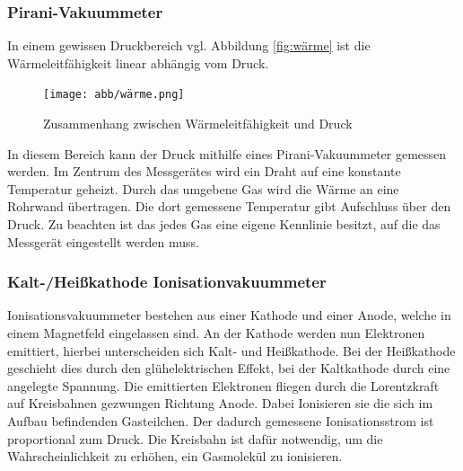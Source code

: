 \subsubsection*{Pirani-Vakuummeter}
In einem gewissen Druckbereich vgl. Abbildung \eqref{fig:wärme} ist die Wärmeleitfähigkeit linear abhängig vom Druck.
\begin{figure}[h]
    \centering
    \texttt{[image: abb/wärme.png]}
    \caption{Zusammenhang zwischen Wärmeleitfähigkeit und Druck \cite{Pfeifer}}
    \label{fig:wärme}
\end{figure}
In diesem Bereich kann der Druck mithilfe eines Pirani-Vakuummeter gemessen werden.
Im Zentrum des Messgerätes wird ein Draht auf eine konstante Temperatur geheizt.
Durch das umgebene Gas wird die Wärme an eine Rohrwand übertragen.
Die dort gemessene Temperatur gibt Aufschluss über den Druck.
Zu beachten ist das jedes Gas eine eigene Kennlinie besitzt,
auf die das Messgerät eingestellt werden muss.

\subsubsection*{Kalt-/Heißkathode Ionisationvakuummeter}
Ionisationsvakuummeter bestehen aus einer Kathode und einer Anode,
welche in einem Magnetfeld eingelassen sind.
An der Kathode werden nun Elektronen emittiert,
hierbei unterscheiden sich Kalt- und Heißkathode.
Bei der Heißkathode geschieht dies durch den glühelektrischen Effekt,
bei der Kaltkathode durch eine angelegte Spannung.
Die emittierten Elektronen fliegen
durch die Lorentzkraft auf Kreisbahnen gezwungen
Richtung Anode.
Dabei Ionisieren sie die sich im Aufbau befindenden Gasteilchen.
Der dadurch gemessene Ionisationsstrom ist proportional zum Druck.
Die Kreisbahn ist dafür notwendig,
um die Wahrscheinlichkeit zu erhöhen, ein Gasmolekül zu ionisieren. 
